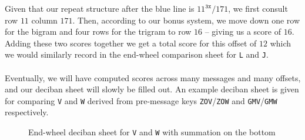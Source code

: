 \noindent Given that our repeat structure after the blue line is
$11^\texttt{3x}/171$, we first consult row $11$ column $171$. Then,
according to our bonus system, we move down one row for the bigram
and four rows for the trigram to row $16$ -- giving us a score of
$16$. Adding these two scores together we get a total score for
this offset of $12$ which we would similarly record in the
end-wheel comparison sheet for \texttt{L} and \texttt{J}.
\\\\Eventually, we will have computed scores across many messages
and many offsets, and our deciban sheet will slowly be filled
out. An example deciban sheet is given for comparing \texttt{V}
and \texttt{W} derived from pre-message keys
\texttt{ZOV}/\texttt{ZOW} and \texttt{GMV}/\texttt{GMW} respectively.
\begin{figure}[H]
	\begin{center}
	\end{center}

	\caption{End-wheel deciban sheet for \texttt{V} and \texttt{W} with
		summation on the bottom }
\end{figure}
